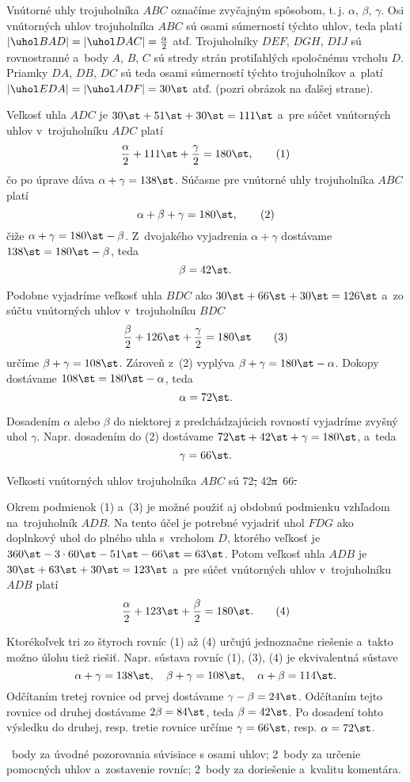 {%
Vnútorné uhly trojuholníka $ABC$ označíme zvyčajným spôsobom, t.\,j. $\alpha$, $\beta$, $\gamma$.
Osi vnútorných uhlov trojuholníka $ABC$ sú osami súmerností týchto uhlov, teda platí
$|\uhol BAD| =|\uhol DAC| =\frac\alpha2$ atď.
Trojuholníky $DEF$, $DGH$, $DIJ$ sú rovnostranné a~body $A$, $B$, $C$ sú stredy strán protiľahlých spoločnému vrcholu $D$.
Priamky $DA$, $DB$, $DC$ sú teda osami súmerností týchto trojuholníkov a~platí
$|\uhol EDA| = |\uhol ADF| = 30\st$ atď.
(pozri obrázok na ďalšej strane).

Veľkosť uhla $ADC$ je $30\st+51\st+30\st =111\st$ a~pre súčet vnútorných uhlov v~trojuholníku $ADC$ platí
$$
\frac\alpha2+111\st+\frac\gamma2 =180\st , \tag{1}
$$
čo po úprave dáva $\alpha+\gamma=138\st$.
Súčasne pre vnútorné uhly trojuholníka $ABC$ platí
$$
\alpha+\beta+\gamma=180\st, \tag{2}
$$
čiže $\alpha+\gamma=180\st-\beta$.
Z~dvojakého vyjadrenia $\alpha+\gamma$ dostávame $138\st =180\st-\beta$, teda
$$
\beta=42\st .
$$

Podobne vyjadríme veľkosť uhla $BDC$ ako $30\st+66\st+30\st =126\st$ a~zo súčtu vnútorných uhlov v~trojuholníku $BDC$
$$
\frac\beta2+126\st+\frac\gamma2 =180\st \tag{3}
$$
určíme $\beta+\gamma=108\st$.
Zároveň z~(2) vyplýva $\beta+\gamma=180\st-\alpha$.
Dokopy dostávame $108\st =180\st-\alpha$, teda
$$
\alpha=72\st .
$$

Dosadením $\alpha$ alebo $\beta$ do niektorej z predchádzajúcich rovností vyjadríme zvyšný uhol $\gamma$.
Napr. dosadením do (2) dostávame $72\st+42\st+\gamma=180\st$, a~teda
$$
\gamma=66\st .
$$

Veľkosti vnútorných uhlov trojuholníka $ABC$ sú 72\st, 42\st a~66\st.
%

\poznamky
Okrem podmienok (1) a~(3) je možné použiť aj obdobnú podmienku vzhľadom na~trojuholník $ADB$.
Na tento účel je potrebné vyjadriť uhol $FDG$ ako doplnkový uhol do plného uhla s~vrcholom $D$, ktorého veľkosť je $360\st-3\cdot60\st-51\st-66\st =63\st$.
Potom veľkosť uhla $ADB$ je $30\st+63\st+30\st =123\st$ a~pre súčet vnútorných uhlov v~trojuholníku $ADB$ platí
$$
\frac\alpha2+123\st+\frac\beta2 =180\st . \tag{4}
$$

Ktorékoľvek tri zo štyroch rovníc (1) až (4) určujú jednoznačne riešenie a~takto možno úlohu tiež riešiť.
Napr. sústava rovníc (1), (3), (4) je ekvivalentná sústave
$$
\alpha+\gamma =138\st, \quad
\beta+\gamma =108\st, \quad
\alpha+\beta =114\st.
$$
Odčítaním tretej rovnice od prvej dostávame $\gamma-\beta=24\st$.
Odčítaním tejto rovnice od druhej dostávame $2\beta=84\st$, teda $\beta=42\st$.
Po dosadení tohto výsledku do druhej, resp. tretie rovnice určíme $\gamma=66\st$, resp. $\alpha=72\st$.

~body za úvodné pozorovania súvisiace s osami uhlov;
2~body za určenie pomocných uhlov a~zostavenie rovníc;
2~body za doriešenie a~kvalitu komentára.
\endhodnotenie
}

